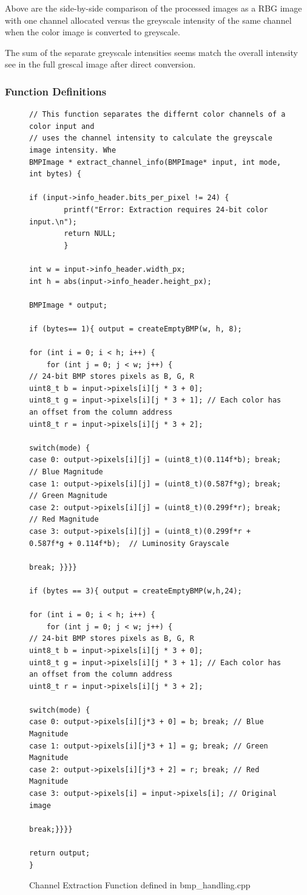 \documentclass[11pt]{article}
\begin{document}
\noindent Above are the side-by-side comparison of the processed images as a RBG image with one channel allocated versus the greyscale intensity of the same channel when the color image is converted to greyscale.

The sum of the separate greyscale intensities seems match the overall intensity see in the full grescal image after direct conversion.



\subsubsection{Function Definitions}

\begin{figure}[H]
\begin{verbatim}
// This function separates the differnt color channels of a color input and
// uses the channel intensity to calculate the greyscale image intensity. Whe
BMPImage * extract_channel_info(BMPImage* input, int mode, int bytes) {

if (input->info_header.bits_per_pixel != 24) {
        printf("Error: Extraction requires 24-bit color input.\n");
        return NULL;
        }

int w = input->info_header.width_px;
int h = abs(input->info_header.height_px);

BMPImage * output;

if (bytes== 1){ output = createEmptyBMP(w, h, 8);

for (int i = 0; i < h; i++) {
    for (int j = 0; j < w; j++) {
// 24-bit BMP stores pixels as B, G, R
uint8_t b = input->pixels[i][j * 3 + 0];
uint8_t g = input->pixels[i][j * 3 + 1]; // Each color has an offset from the column address
uint8_t r = input->pixels[i][j * 3 + 2];

switch(mode) {
case 0: output->pixels[i][j] = (uint8_t)(0.114f*b); break; // Blue Magnitude
case 1: output->pixels[i][j] = (uint8_t)(0.587f*g); break; // Green Magnitude
case 2: output->pixels[i][j] = (uint8_t)(0.299f*r); break; // Red Magnitude
case 3: output->pixels[i][j] = (uint8_t)(0.299f*r + 0.587f*g + 0.114f*b);  // Luminosity Grayscale

break; }}}}

if (bytes == 3){ output = createEmptyBMP(w,h,24);

for (int i = 0; i < h; i++) {
    for (int j = 0; j < w; j++) {
// 24-bit BMP stores pixels as B, G, R
uint8_t b = input->pixels[i][j * 3 + 0];
uint8_t g = input->pixels[i][j * 3 + 1]; // Each color has an offset from the column address
uint8_t r = input->pixels[i][j * 3 + 2];

switch(mode) {
case 0: output->pixels[i][j*3 + 0] = b; break; // Blue Magnitude
case 1: output->pixels[i][j*3 + 1] = g; break; // Green Magnitude
case 2: output->pixels[i][j*3 + 2] = r; break; // Red Magnitude
case 3: output->pixels[i] = input->pixels[i]; // Original image 

break;}}}}

return output;
}
\end{verbatim}
\caption{Channel Extraction Function defined in bmp\_handling.cpp}
\label{figure:Extraction}
\end{figure}
\end{document}
